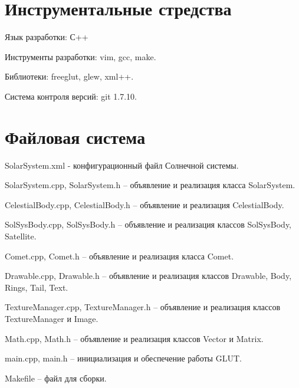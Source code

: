 \documentclass[oneside,final]{article}
\begin{document}
\section{Инструментальные стредства}
\par Язык разработки: С++
\par Инструменты разработки: vim, gcc, make.
\par Библиотеки: freeglut, glew, xml++.
\par Система контроля версий: git 1.7.10.

\section{Файловая система}
\par SolarSystem.xml - конфигурационный файл Солнечной системы.
\par SolarSystem.cpp, SolarSystem.h -- объявление и реализация класса SolarSystem.
\par CelestialBody.cpp, CelestialBody.h -- объявление и реализация CelestialBody.
\par SolSysBody.cpp, SolSysBody.h -- объявление и реализация классов SolSysBody, Satellite.
\par Comet.cpp, Comet.h -- объявление и реализация класса Comet.
\par Drawable.cpp, Drawable.h -- объявление и реализация классов Drawable, Body, Rings, Tail, Text.
\par TextureManager.cpp, TextureManager.h -- объявление и реализация классов TextureManager и Image.
\par Math.cpp, Math.h -- объявление и реализация классов Vector и Matrix.
\par main.cpp, main.h -- инициализация и обеспечение работы GLUT.
\par Makefile -- файл для сборки.
\end{document}
